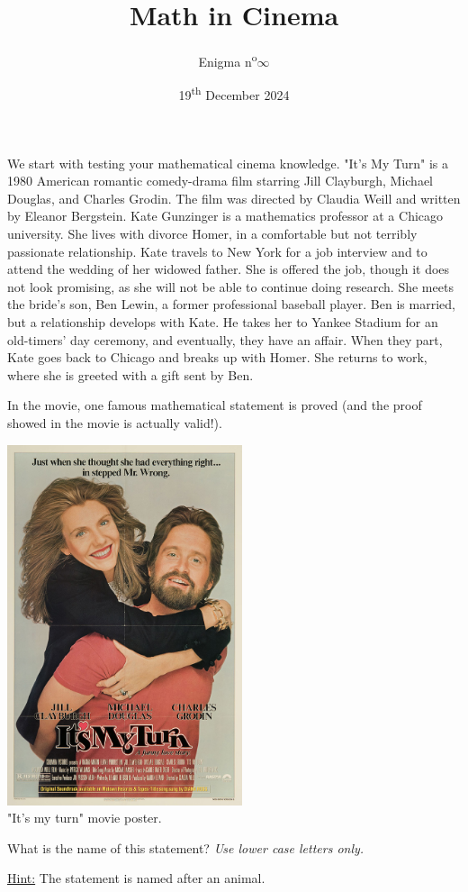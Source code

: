 \documentclass[a4paper, top=10mm]{article}
\title{\textbf{\huge{Math in Cinema}}}
\author{Enigma n\textsuperscript{o}$\infty$}
\date{19\textsuperscript{th} December 2024}
\begin{document}
	\maketitle
	
	We start with testing your mathematical cinema knowledge.
	"It's My Turn" is a 1980 American romantic comedy-drama film starring Jill Clayburgh, Michael Douglas, and Charles Grodin.
	The film was directed by Claudia Weill and written by Eleanor Bergstein.
	Kate Gunzinger is a mathematics professor at a Chicago university.
	She lives with divorce Homer, in a comfortable but not terribly passionate relationship.
	Kate travels to New York for a job interview and to attend the wedding of her widowed father.
	She is offered the job, though it does not look promising, as she will not be able to continue doing research.
	She meets the bride’s son, Ben Lewin, a former	professional baseball player.
	Ben is married, but a relationship develops with Kate.
	He takes her to Yankee Stadium for an old-timers’ day ceremony, and eventually, they have an affair.
	When they part, Kate goes back to Chicago and breaks up with Homer. She returns to work, where she is greeted with a gift sent by Ben.
	
	In the movie, one famous mathematical statement is proved (and the proof showed in the movie is actually valid!).
	
	\begin{center}
		\includegraphics[height=300pt]{10it_is_my_turn.png}\\
		"It's my turn" movie poster.
	\end{center}
	
	What is the name of this statement?
	\textit{Use lower case letters only.}
	
	\vspace{1cm}
	
	\underline{Hint:} The statement is named after an animal.
	
	
\end{document}

